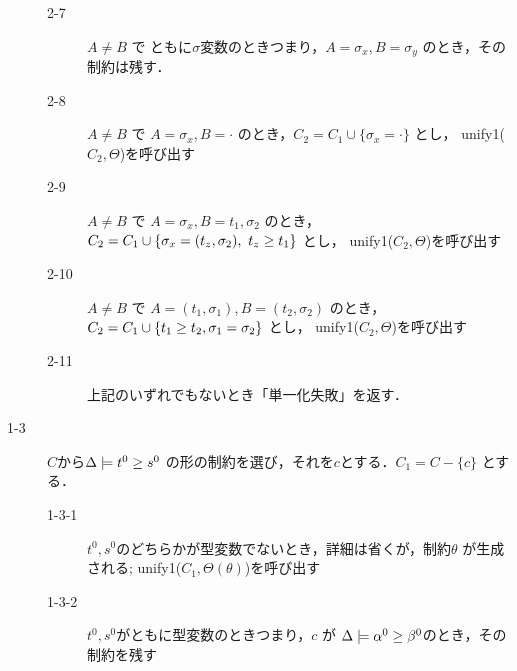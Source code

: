 \begin{oframed}
\begin{description}
\begin{description}
    \item[2-7] $A \neq B$ で ともに$\sigma$変数のときつまり，$A = \sigma_x , B = \sigma_y$ のとき，その制約は残す．
    \item[2-8] $A \neq B$ で $A = \sigma_x , B = \cdot$ のとき，$C_2 = C_1 \cup \{\sigma_x = \cdot\}$ とし， unify1($C_2, \Theta$)を呼び出す
    \item[2-9] $A \neq B$ で $A = \sigma_x , B = t_1, \sigma_2$ のとき，$C_2 = C_1 \cup \{\sigma_x = (t_z,\sigma_2),~ {t_z} \ge {t_1} \}$ とし， unify1($C_2, \Theta$)を呼び出す
    \item[2-10] $A \neq B$ で $A = (t_1, \sigma_1) , B = (t_2, \sigma_2)$ のとき，$C_2 = C_1 \cup \{{t_1} \ge {t_2}, \sigma_1 = \sigma_2 \}$ とし， unify1($C_2, \Theta$)を呼び出す
    \item[2-11] 上記のいずれでもないとき「単一化失敗」を返す．
    \end{description}
  \item[1-3] $C$から$\Delta \models {t^0} \ge {s^0}$ の形の制約を選び，それを$c$とする．$C_1 = C - \{c\}$ とする．
    \begin{description}
    \item[1-3-1] $t^0,s^0$のどちらかが型変数でないとき，詳細は省くが，制約$\theta$ が生成される;
      unify1($C_1, \Theta(\theta)$)を呼び出す
    \item[1-3-2] $t^0,s^0$がともに型変数のときつまり，$c$ が $\Delta \models {\alpha^0} \ge {\beta^0}$のとき，その制約を残す
    \end{description}
  \end{description}
\end{oframed}




